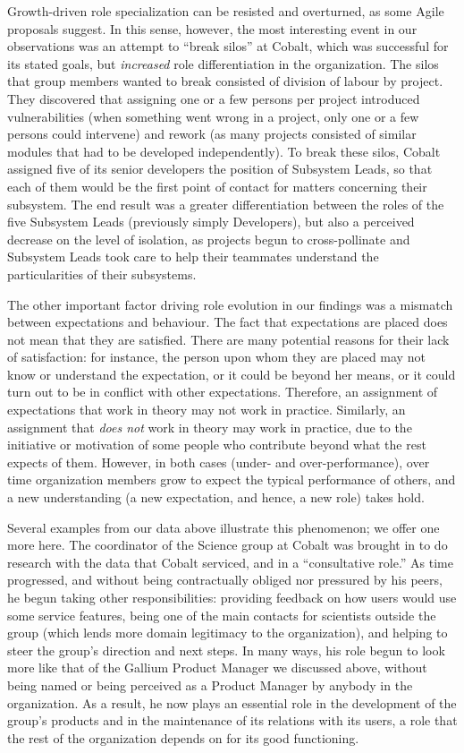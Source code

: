 \documentclass[10pt, conference, compsocconf]{IEEEtran}
\begin{document}
Growth-driven role specialization can be resisted and overturned, as some Agile proposals suggest. In this sense, however, the most interesting event in our observations was an attempt to ``break silos'' at Cobalt, which was successful for its stated goals, but \emph{increased} role differentiation in the organization. The silos that group members wanted to break consisted of division of labour by project. They discovered that assigning one or a few persons per project introduced vulnerabilities (when something went wrong in a project, only one or a few persons could intervene) and rework (as many projects consisted of similar modules that had to be developed independently). To break these silos, Cobalt assigned five of its senior developers the position of Subsystem Leads, so that each of them would be the first point of contact for matters concerning their subsystem. The end result was a greater differentiation between the roles of the five Subsystem Leads (previously simply Developers), but also a perceived decrease on the level of isolation, as projects begun to cross-pollinate and Subsystem Leads took care to help their teammates understand the particularities of their subsystems.

The other important factor driving role evolution in our findings was a mismatch between expectations and behaviour. The fact that expectations are placed does not mean that they are satisfied. There are many potential reasons for their lack of satisfaction: for instance, the person upon whom they are placed may not know or understand the expectation, or it could be beyond her means, or it could turn out to be in conflict with other expectations. Therefore, an assignment of expectations that work in theory may not work in practice. Similarly, an assignment that \emph{does not} work in theory may work in practice, due to the initiative or motivation of some people who contribute beyond what the rest expects of them. However, in both cases (under- and over-performance), over time organization members grow to expect the typical performance of others, and a new understanding (a new expectation, and hence, a new role) takes hold.

Several examples from our data above illustrate this phenomenon; we offer one more here. The coordinator of the Science group at Cobalt was brought in to do research with the data that Cobalt serviced, and in a ``consultative role.'' As time progressed, and without being contractually obliged nor pressured by his peers, he begun taking other responsibilities: providing feedback on how users would use some service features, being one of the main contacts for scientists outside the group (which lends more domain legitimacy to the organization), and helping to steer the group's direction and next steps. In many ways, his role begun to look more like that of the Gallium Product Manager we discussed above, without being named or being perceived as a Product Manager by anybody in the organization. As a result, he now plays an essential role in the development of the group's products and in the maintenance of its relations with its users, a role that the rest of the organization depends on for its good functioning.
\end{document}

